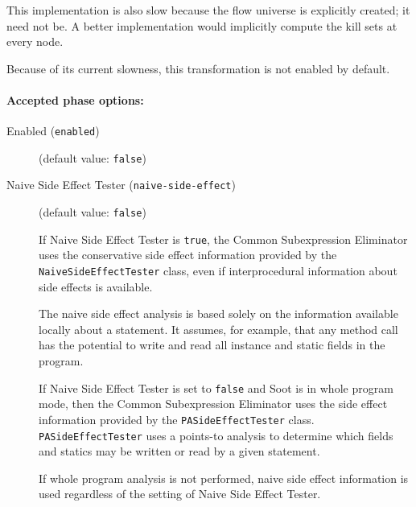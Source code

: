 \documentclass{article}
\begin{document}
\par

This implementation is also slow because the flow universe is
explicitly created; it need not be.  A better implementation
would implicitly compute the kill sets at every node.


\par

Because of its current slowness, this transformation is not
enabled by default.



\paragraph{Accepted phase options:} 

\begin{description}

\item[Enabled ({\tt enabled})]
(default value: {\tt false})






\item[Naive Side Effect Tester ({\tt naive-side-effect})]
(default value: {\tt false})





\par

If Naive Side Effect Tester is {\tt true}, the Common
Subexpression Eliminator uses the conservative side effect
information provided by the {\tt NaiveSideEffectTester} class,
even if interprocedural information about side effects is
available.

\par

The naive side effect analysis is based solely on the information
available locally about a statement. It assumes, for example,
that any method call has the potential to write and read all
instance and static fields in the program.

\par

If Naive Side Effect Tester is set to {\tt false} and Soot is
in whole program mode, then the Common Subexpression
Eliminator uses the side effect information provided by the
{\tt PASideEffectTester} class. {\tt PASideEffectTester}
uses a points-to analysis to
determine which fields and statics may be written or read by a
given statement.

\par

If whole program analysis is not performed, naive side effect
information is used regardless of the setting of
Naive Side Effect Tester.




\end{description}
\end{document}
